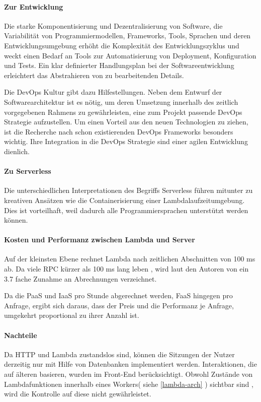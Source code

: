 \documentclass[
12pt,
english,
ngerman,
headsepline,
twoside,
openright,
numbers=noenddot,version=first
]{scrreprt}
\begin{document}
\paragraph{Zur Entwicklung}
Die starke Komponentisierung und Dezentralisierung von Software, die Variabilität von Programmiermodellen, Frameworks, Tools, Sprachen und deren Entwicklungsumgebung erhöht die Komplexität des Entwicklungszyklus und weckt einen Bedarf an Tools zur Automatisierung von Deployment, Konfiguration und Tests. Ein klar definierter Handlungsplan bei der Softwareentwicklung  erleichtert das Abstrahieren von zu bearbeitenden Details.

Die DevOps Kultur gibt dazu Hilfestellungen. Neben dem Entwurf der Softwarearchitektur ist es nötig, um deren Umsetzung innerhalb des zeitlich vorgegebenen Rahmens zu gewährleisten, eine zum Projekt passende DevOps Strategie aufzustellen.
Um einen Vorteil aus den neuen Technologien zu ziehen, ist die Recherche nach schon existierenden DevOps Frameworks besonders wichtig. Ihre Integration in die DevOps Strategie sind einer agilen Entwicklung dienlich.


\paragraph{Zu Serverless} Die unterschiedlichen Interpretationen des Begriffs Serverless führen mitunter zu kreativen Ansätzen wie die Containerisierung einer Lambdalaufzeitumgebung. Dies ist vorteilhaft, weil dadurch alle Programmiersprachen unterstützt werden können.


\paragraph{Kosten und Performanz zwischen Lambda und Server}
Auf der kleinsten Ebene rechnet Lambda nach zeitlichen Abschnitten von 100 ms ab. Da viele \acrshort{RPC} kürzer als 100 ms lang leben \cite{rpcTime}, wird laut den Autoren von \cite{lambdaOpen} ein 3.7 fache Zunahme an Abrechnungen verzeichnet.

Da die \acrshort{PaaS} und \acrshort{IaaS} pro Stunde abgerechnet werden, \acrshort{FaaS} hingegen pro Anfrage, ergibt sich daraus, dass der Preis und die Performanz je Anfrage, umgekehrt proportional zu ihrer Anzahl ist.


\paragraph{Nachteile} 
Da HTTP und Lambda zustandslos sind, können die Sitzungen der Nutzer derzeitig nur mit Hilfe von Datenbanken implementiert werden. Interaktionen, die auf älteren basieren, wurden im Front-End berücksichtigt. Obwohl Zustände von Lambdafunktionen innerhalb eines \glqq Workers\grqq ( siehe \autoref{lambda-arch} ) sichtbar sind \cite{lambdaOpen}, wird die Kontrolle auf diese nicht gewährleistet.
\end{document}
